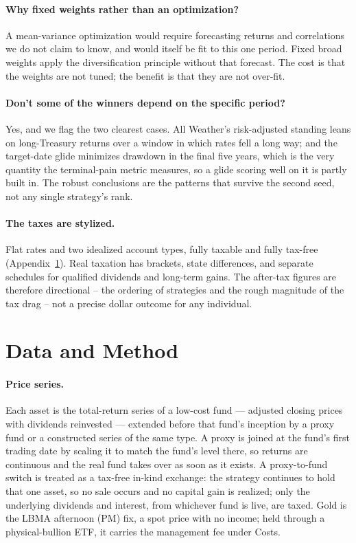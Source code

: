 \documentclass[11pt]{article}
\begin{document}
\paragraph{Why fixed weights rather than an optimization?} A mean-variance optimization would require
forecasting returns and correlations we do not claim to know, and would itself be fit to this one
period. Fixed broad weights apply the diversification principle without that forecast. The cost is that
the weights are not tuned; the benefit is that they are not over-fit.

\paragraph{Don't some of the winners depend on the specific period?} Yes, and we flag the two clearest
cases. All Weather's risk-adjusted standing leans on long-Treasury returns over a window in which rates
fell a long way; and the target-date glide minimizes drawdown in the final five years, which is the very
quantity the terminal-pain metric measures, so a glide scoring well on it is partly built in. The robust
conclusions are the patterns that survive the second seed, not any single strategy's rank.

\paragraph{The taxes are stylized.} Flat rates and two idealized account types, fully taxable and fully
tax-free (Appendix~\ref{sec:datamethod}). Real taxation has brackets, state differences, and separate
schedules for qualified dividends and long-term gains. The after-tax figures are therefore directional
-- the ordering of strategies and the rough magnitude of the tax drag -- not a precise dollar outcome
for any individual.

\appendix

\section{Data and Method}\label{sec:datamethod}

\paragraph{Price series.} Each asset is the total-return series of a low-cost fund --- adjusted closing
prices with dividends reinvested --- extended before that fund's inception by a proxy fund or a
constructed series of the same type. A proxy is joined at the fund's first trading date by scaling it
to match the fund's level there, so returns are continuous and the real fund takes over as soon as it
exists. A proxy-to-fund switch is treated as a tax-free in-kind exchange: the strategy continues to
hold that one asset, so no sale occurs and no capital gain is realized; only the underlying dividends
and interest, from whichever fund is live, are taxed. Gold is the LBMA afternoon (PM) fix, a spot
price with no income; held through a physical-bullion ETF, it carries the management fee under Costs.
\end{document}
